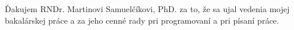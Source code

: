 \thispagestyle{empty}
\vspace*{\fill}
\hfill
\begin{minipage}{0.65\textwidth}
\vspace{0pt}\raggedright
Ďakujem RNDr. Martinovi Samuelčíkovi, PhD. za to, že sa
ujal vedenia mojej bakalárskej práce a za jeho cenné rady
pri programovaní a pri písaní práce. 
\end{minipage}
\vspace*{\fill}
\eject